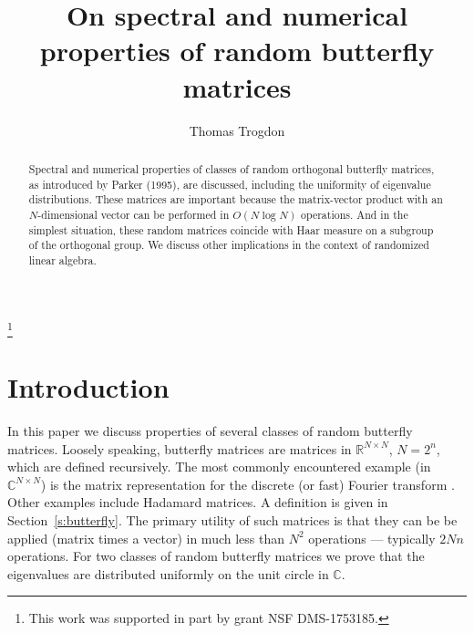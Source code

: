 \documentclass{amsart}
\theoremstyle{definition}
\theoremstyle{remark}
\numberwithin{equation}{section}
\begin{document}
\title{On spectral and numerical properties of random butterfly matrices}


\author{Thomas Trogdon}
\address{Department of Mathematics, University of California, Irvine}


\thanks{This work was supported in part by grant NSF DMS-1753185.}


\date{}

\dedicatory{}

\begin{abstract}
Spectral and numerical properties of classes of random orthogonal butterfly matrices, as introduced by Parker (1995), are discussed, including the uniformity of eigenvalue distributions. These matrices are important because the matrix-vector product with an $N$-dimensional vector can be performed in $O(N \log N)$ operations. And in the simplest situation, these random matrices coincide with Haar measure on a subgroup of the orthogonal group.  We discuss other implications in the context of randomized linear algebra. 
\end{abstract}

\maketitle





\section{Introduction}

In this paper we discuss properties of several classes of random butterfly matrices.  Loosely speaking, butterfly matrices are matrices in $\mathbb R^{N\times N}$, $N = 2^n$, which are defined recursively.  The most commonly encountered example (in $\mathbb C^{N\times N}$) is the matrix representation for the discrete (or fast) Fourier transform \cite{VanLoan1992}.  Other examples include Hadamard matrices.  A definition is given in Section~\ref{s:butterfly}.  The primary utility of such matrices is that they can be be applied (matrix times a vector) in much less than $N^2$ operations --- typically $2 N n$ operations.  For two classes of random butterfly matrices we prove that the eigenvalues are distributed uniformly on the unit circle in $\mathbb C$.
\end{document}
